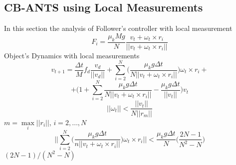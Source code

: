 \documentclass[letterpaper, 10 pt, conference]{ieeeconf}
\begin{document}
\subsection{CB-ANTS using Local Measurements}\label{cblm}
In this section the analysis of
Follower's controller with local measurement
\begin{equation}
F_i=\frac{\mu_kMg}{N}\frac{v_t+\omega_t\times r_i}{||v_t+\omega_t\times r_i||}
\end{equation}
Object's Dynamics with local measurements
\begin{equation*}
v_{t+1}= \frac{\Delta t}{M}f_d\frac{v_d}{||v_d||}+\sum_{i=2}^N \bigg(\frac{\mu_k g \Delta t}{N||v_t+\omega_t \times r_i||} \bigg) \omega_t \times r_i+
\end{equation*}
\begin{equation}
+\Bigg(1+\sum_{i=2}^N \frac{\mu_k g \Delta t}{N||v_t + \omega_t \times r_i||}-\frac{\mu_k g \Delta t}{||v_t||}\Bigg)v_t
\end{equation}
\begin{equation}
||\omega_t||<\frac{||v_t||}{N||r_m||}
\end{equation}
$m=\max\limits_{i}||r_i||$, $i=2,\hdots,N$
\begin{equation}
\Bigg| \Bigg| \sum_{i=2}^N \Bigg( \frac{\mu_k g \Delta t}{n||v_t+ \omega_t \times r_i||} \Bigg)\omega_t \times r_i \Bigg| \Bigg|< \frac{\mu_k g \Delta t}{N} \Bigg( \frac{2N-1}{N^2-N} \Bigg)
\end{equation}
$(2N-1)/(N^2-N)$
\end{document}
